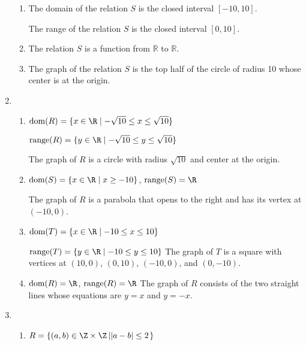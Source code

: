 \begin{enumerate}
\begin{enumerate}
\item The domain of the relation $S$ is the closed interval $\left[ -10, 10 \right]$.

The range of the relation $S$ is the closed interval $\left[ 0, 10 \right]$.


\item The relation $S$ is a function from $\mathbb{R}$ to $\mathbb{R}$.

\item The graph of the relation $S$ is the top half of the circle of radius 10 whose center is at the origin.
\end{enumerate}


\item \begin{enumerate}
\item $\text{dom}(R) = \{ x \in \R \mid -\sqrt{10} \leq x \leq \sqrt{10} \}$

$\text{range}(R) = \{ y \in \R \mid -\sqrt{10} \leq y \leq \sqrt{10} \}$

The graph of $R$ is a circle with radius $\sqrt{10}$ and center at the origin.

\item $\text{dom}(S) = \{ x \in \R \mid x \geq -10 \}$, 
$\text{range}(S) = \R$

The graph of $R$ is a parabola that opens to the right and has its vertex at $(-10, 0)$.

\item $\text{dom}(T) = \{ x \in \R \mid -10 \leq x \leq 10 \}$

$\text{range}(T) = \{ y \in \R \mid -10 \leq y \leq 10 \}$ \quad 
The graph of $T$ is a square with vertices at $(10, 0)$, $(0, 10)$, $(-10, 0)$, and $(0, -10)$. 

\item $\text{dom}(R) = \R$, $\text{range}(R) = \R$ \quad 
The graph of $R$ consists of the two straight lines whose equations are $y = x$ and $y = -x$.
\end{enumerate}


\item \begin{enumerate}
\item $R = \left\{ (a, b) \in \Z \times \Z \left| \left| a - b \right| \leq 2 \right. \right\}$


\end{enumerate}
\end{enumerate}
